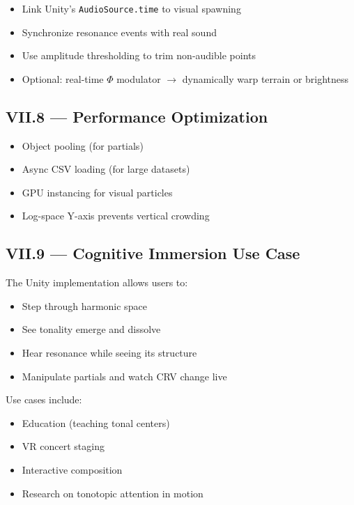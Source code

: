 \documentclass{article}
\begin{document}
\begin{itemize}
    \item Link Unity’s \texttt{AudioSource.time} to visual spawning
    \item Synchronize resonance events with real sound
    \item Use amplitude thresholding to trim non-audible points
    \item Optional: real-time $\Phi$ modulator $\rightarrow$ dynamically warp terrain or brightness
\end{itemize}

\subsection*{VII.8 — Performance Optimization}

\begin{itemize}
    \item Object pooling (for partials)
    \item Async CSV loading (for large datasets)
    \item GPU instancing for visual particles
    \item Log-space Y-axis prevents vertical crowding
\end{itemize}

\subsection*{VII.9 — Cognitive Immersion Use Case}

The Unity implementation allows users to:

\begin{itemize}
    \item Step through harmonic space
    \item See tonality emerge and dissolve
    \item Hear resonance while seeing its structure
    \item Manipulate partials and watch CRV change live
\end{itemize}

Use cases include:

\begin{itemize}
    \item Education (teaching tonal centers)
    \item VR concert staging
    \item Interactive composition
    \item Research on tonotopic attention in motion
\end{itemize}
\end{document}
